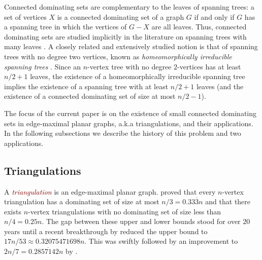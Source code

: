 \documentclass[11pt]{article}
\newcommand{\pat}[1]{\textcolor{red}{PM: #1}}
\newcommand{\defin}[1]{\emph{\textcolor{Maroon}{#1}}}
\theoremstyle{definition}
\newcommand{\vida}[1]{[{\color{pink}VD: #1}]}
\begin{document}
Connected dominating sets are complementary to the leaves of spanning trees: a set of vertices $X$ is a connected dominating set of a graph $G$ if and only if $G$ has a spanning tree in which the vertices of $G-X$ are all leaves. Thus, connected dominating sets are studied implicitly in the literature on spanning trees with many leaves \citep{DBLP:journals/jgt/DingJS01, kleitman.west:spanning, kleitman.west:spanning, doi:10.1137/100801251,doi:10.1137/060664318, DBLP:conf/esa/BousquetI0MOSW20, noguchi.zamfirescu:spanning}. A closely related and extensively studied notion is that of spanning trees with no degree two vertices, known as \emph{homeomorphically irreducible spanning trees} \citep{chen.ren.ea:homeomorphically,albertson.berman.ea:graphs,CHEN2013409, DBLP:journals/jgt/ItoT22, DBLP:journals/jgt/Hoffmann-Ostenhof18a, gessel2023good}.  Since an $n$-vertex tree with no degree $2$-vertices has at least $n/2+1$ leaves, the existence of a homeomorphically irreducible spanning tree implies the existence of a spanning tree with at least $n/2+1$ leaves (and the existence of a connected dominating set of size at most $n/2-1$).


The focus of the current paper is on the existence of small connected dominating sets in edge-maximal planar graphs, a.k.a triangulations, and their applications.  In the following subsections we describe the history of this problem and two applications.





\subsection{Triangulations}

A \defin{triangulation} is an edge-maximal planar graph.  \citet{matheson.tarjan:dominating} proved that every $n$-vertex triangulation has a dominating set of size at most $n/3=0.33\overline{3}n$ and that there exists $n$-vertex triangulations with no dominating set of size less than $n/4=0.25n$. The gap between these upper and lower bounds stood for over $20$ years until a recent breakthrough by \citet{spacapan:domination} reduced the upper bound to $17n/53\approx 0.32075471698n$.  This was swiftly followed by an improvement to $2n/7= 0.2\overline{857142}n$ by \citet{christiansen.rotenberg.ea:triangulations}.
\end{document}
